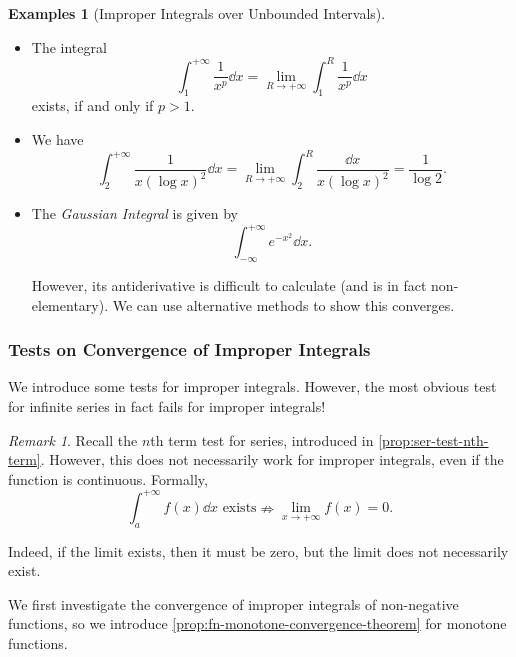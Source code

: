 \documentclass[11pt]{article}
\numberwithin{equation}{section}
\theoremstyle{definition}
\newtheorem{examples}[theorem]{Examples}
\theoremstyle{remark}
\newtheorem{remark}[theorem]{Remark}
\newcommand{\pqty}[1]{\left(#1\right)}
\newcommand{\plusinfty}{+\infty}
\newcommand{\minusinfty}{-\infty}
\newcommand{\notimplies}{\nRightarrow}
\begin{document}
\begin{examples}[Improper Integrals over Unbounded Intervals]\label{analysis-unit-0180}
    \label{ex:improper-integrals-unbounded-intervals}%
    \begin{itemize}
        \item The integral
        \[
            \int_{1}^{\plusinfty} \frac{1}{x^p} \dd{x} = \lim_{R \to \plusinfty} \int_{1}^{R} \frac{1}{x^p} \dd{x}
        \]
        exists, if and only if \(p > 1\).

        \item We have
        \[
            \int_{2}^{\plusinfty} \frac{1}{x \pqty{\log x}^2} \dd{x} = \lim_{R \to \plusinfty} \int_{2}^{R} \frac{\dd{x}}{x \pqty{\log x}^2} = \frac{1}{\log 2}.
        \]

        \item The \emph{Gaussian Integral} is given by
        \[
            \int_{\minusinfty}^{\plusinfty} e^{- x^2} \dd{x}.
        \]

        However, its antiderivative is difficult to calculate (and is in fact non-elementary). We can use alternative methods to show this converges.
    \end{itemize}
\end{examples}

\subsubsection{Tests on Convergence of Improper Integrals}

We introduce some tests for improper integrals. However, the most obvious test for infinite series in fact fails for improper integrals!

\begin{remark}\label{analysis-unit-0181}
    Recall the \(n\)th term test for series, introduced in \autoref{prop:ser-test-nth-term}. However, this does not necessarily work for improper integrals, even if the function is continuous. Formally,
    \[
        \int_{a}^{\plusinfty} f\pqty{x} \dd{x} \text{ exists} \notimplies \lim_{x \to \plusinfty} f\pqty{x} = 0.
    \]

    Indeed, if the limit exists, then it must be zero, but the limit does not necessarily exist.
\end{remark}

We first investigate the convergence of improper integrals of non-negative functions, so we introduce \autoref{prop:fn-monotone-convergence-theorem} for monotone functions.
\end{document}
